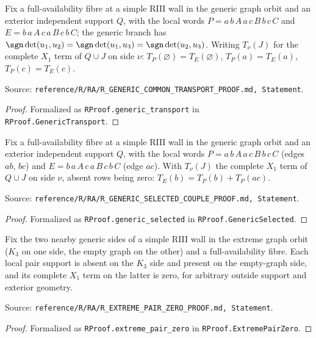 \begin{obligation}\label{R:generic_transport}\leanok
Fix a full-availability fibre at a simple RIII wall in the generic graph orbit and an exterior independent support $Q$,
with the local words $P=a\,b\,A\,a\,c\,B\,b\,c\,C$ and $E=b\,a\,A\,c\,a\,B\,c\,b\,C$; the generic branch has
$\sgn\det(u_1,u_2)=\sgn\det(u_1,u_3)=\sgn\det(u_2,u_3)$. Writing $T_\nu(J)$ for the complete $X_1$ term of $Q\cup J$ on side
$\nu$: $T_P(\varnothing)=T_E(\varnothing)$, $T_P(a)=T_E(a)$, $T_P(c)=T_E(c)$.

Source: \texttt{reference/R/RA/R\_GENERIC\_COMMON\_TRANSPORT\_PROOF.md, Statement}.
\end{obligation}
\begin{proof}\leanok{}
Formalized as \texttt{RProof.generic\_transport} in \texttt{RProof.GenericTransport}.
\end{proof}

\begin{obligation}\label{R:generic_selected}\leanok
Fix a full-availability fibre at a simple RIII wall in the generic graph orbit and an exterior independent support $Q$,
with the local words $P=a\,b\,A\,a\,c\,B\,b\,c\,C$ (edges $ab$, $bc$) and $E=b\,a\,A\,c\,a\,B\,c\,b\,C$ (edge $ac$). With
$T_\nu(J)$ the complete $X_1$ term of $Q\cup J$ on side $\nu$, absent rows being zero: $T_E(b)=T_P(b)+T_P(ac)$.

Source: \texttt{reference/R/RA/R\_GENERIC\_SELECTED\_COUPLE\_PROOF.md, Statement}.
\end{obligation}
\begin{proof}\leanok{}
Formalized as \texttt{RProof.generic\_selected} in \texttt{RProof.GenericSelected}.
\end{proof}

\begin{obligation}\label{R:extreme_pair_zero}\leanok
Fix the two nearby generic sides of a simple RIII wall in the extreme graph orbit ($K_3$ on one side, the empty graph on
the other) and a full-availability fibre. Each local pair support is absent on the $K_3$ side and present on the empty-graph
side, and its complete $X_1$ term on the latter is zero, for arbitrary outside support and exterior geometry.

Source: \texttt{reference/R/RA/R\_EXTREME\_PAIR\_ZERO\_PROOF.md, Statement}.
\end{obligation}
\begin{proof}\leanok{}
Formalized as \texttt{RProof.extreme\_pair\_zero} in \texttt{RProof.ExtremePairZero}.
\end{proof}

